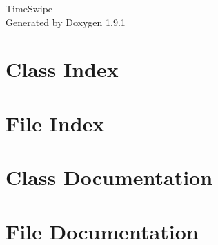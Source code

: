 \let\mypdfximage\pdfximage\def\pdfximage{\immediate\mypdfximage}\documentclass[twoside]{book}
\newcommand{\+}{\discretionary{\mbox{\scriptsize$\hookleftarrow$}}{}{}}
\newcommand{\clearemptydoublepage}{%
  \newpage{\pagestyle{empty}\cleardoublepage}%
}
\begin{document}
\raggedbottom

\hypersetup{pageanchor=false,
             bookmarksnumbered=true,
             pdfencoding=unicode
            }
\begin{titlepage}
\vspace*{7cm}
\begin{center}%
{\Large Time\+Swipe }\\
\vspace*{1cm}
{\large Generated by Doxygen 1.9.1}\\
\end{center}
\end{titlepage}
\clearemptydoublepage
{}
\tableofcontents
\clearemptydoublepage
{}
\hypersetup{pageanchor=true}

\chapter{Class Index}

\chapter{File Index}

\chapter{Class Documentation}










\chapter{File Documentation}


\backmatter
\newpage
{}
\clearemptydoublepage
{}
\printindex
\end{document}
